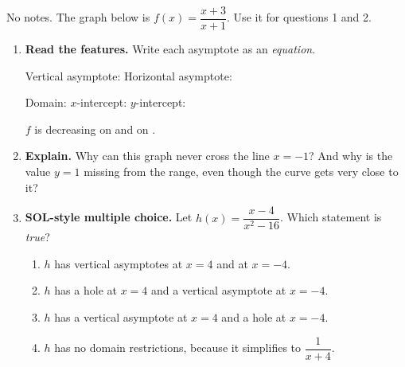 \documentclass[10pt]{article}
\newcommand{\lgrid}[4]{%
  \draw[step=1, linegray!40, very thin] (#1,#3) grid (#2,#4);
  \draw[->, semithick, charcoal] (#1,0)--(#2,0) node[below right, font=\scriptsize]{$x$};
  \draw[->, semithick, charcoal] (0,#3)--(0,#4) node[left, font=\scriptsize]{$y$};}
\begin{document}
\namedateperiod

\vspace{0.08in}

No notes. The graph below is $f(x) = \dfrac{x+3}{x+1}$. Use it for questions 1 and 2.
\begin{center}
\end{center}

\begin{enumerate}[leftmargin=1.8em, itemsep=8pt]
  \item \textbf{Read the features.} Write each asymptote as an \emph{equation}.

        Vertical asymptote: \blank{2.0cm} \quad Horizontal asymptote: \blank{2.0cm}

        \vspace{3pt}
        Domain: \blank{4.6cm} \quad $x$-intercept: \blank{1.8cm} \quad $y$-intercept: \blank{1.8cm}

        \vspace{3pt}
        $f$ is decreasing on \blank{2.4cm} and on \blank{2.4cm}.

  \item \textbf{Explain.} Why can this graph never cross the line $x=-1$? And why is the value $y=1$
        missing from the range, even though the curve gets very close to it?

  \item \textbf{SOL-style multiple choice.} Let $h(x) = \dfrac{x-4}{x^2-16}$. Which statement is
        \emph{true}?
        \begin{enumerate}[label=\Alph*., leftmargin=1.9em, itemsep=1pt]
          \item $h$ has vertical asymptotes at $x=4$ and at $x=-4$.
          \item $h$ has a hole at $x=4$ and a vertical asymptote at $x=-4$.
          \item $h$ has a vertical asymptote at $x=4$ and a hole at $x=-4$.
          \item $h$ has no domain restrictions, because it simplifies to $\dfrac{1}{x+4}$.
        \end{enumerate}
\end{enumerate}
\end{document}
